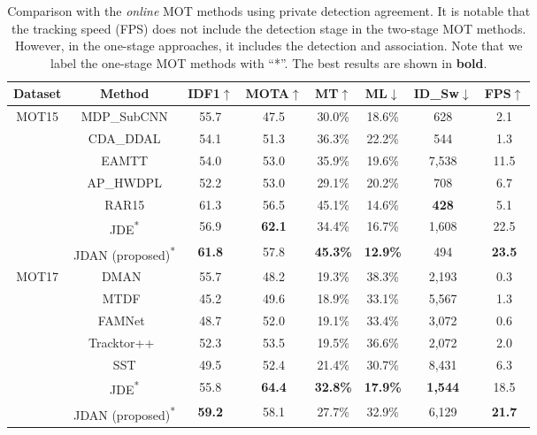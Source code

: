 \documentclass[acmsmall]{acmart}
\begin{document}
\begin{table}[tbp]
	\begin{center}
		\caption{
			Comparison with the \emph{online} MOT methods using private detection agreement. 
			It is notable that the tracking speed (FPS) does not include the detection stage in the two-stage MOT methods. 
			However, in the one-stage approaches, it includes the detection and association. 
			Note that we label the one-stage MOT methods with ``*''. 
			The best results are shown in {\bf bold}.
		}
		\label{table:sota}
		\centering
		\setlength{\tabcolsep}{3.5pt}
		\begin{tabular}{c|c|cccccc}
			\hline
			\hline
			Dataset & Method & IDF1$\uparrow$ & MOTA$\uparrow$ & MT$\uparrow$ & ML$\downarrow$ & ID\_Sw$\downarrow$ & FPS$\uparrow$\\
			\hline
			MOT15 
			& MDP\_SubCNN\cite{xiang2015learning} & 55.7 & 47.5 & 30.0\% & 18.6\% & 628 & 2.1\\
			& CDA\_DDAL\cite{bae2017confidence} & 54.1 & 51.3 & 36.3\% & 22.2\% & 544 & 1.3\\
			& EAMTT\cite{sanchez2016online} & 54.0 & 53.0 & 35.9\% & 19.6\% & 7,538 & 11.5\\ 
			& AP\_HWDPL\cite{chen2017online} & 52.2 & 53.0 & 29.1\% & 20.2\% & 708 & 6.7\\
			& RAR15\cite{fang2018recurrent} & 61.3 & 56.5 & 45.1\% & 14.6\% & {\bf 428} & 5.1\\
			& {JDE\cite{jde}\textsuperscript{*}} & {56.9} & {{\bf 62.1}} & {34.4\%} & {16.7\%} & {1,608} & {22.5}\\
			& JDAN (proposed)\textsuperscript{*} & {\bf 61.8} & 57.8 & {\bf 45.3\%} & {\bf 12.9\%} & 494 & {\bf 23.5}\\
			\hline
			MOT17 
			& DMAN~\cite{dual_matching} & 55.7 & 48.2 & 19.3\% & 38.3\% & 2,193 & 0.3\\
			& MTDF~\cite{gm_phd} & 45.2 & 49.6 & 18.9\% & 33.1\% & 5,567 & 1.3\\
			& FAMNet~\cite{famnet} & 48.7 & 52.0 & 19.1\% & 33.4\% & 3,072 & 0.6\\
			& Tracktor++~\cite{tracktor} & 52.3 & 53.5 & 19.5\% & 36.6\% & 2,072 & 2.0\\
			& SST\cite{dan} & 49.5 & 52.4 & 21.4\% & 30.7\% & 8,431 & 6.3\\
			& {JDE\cite{jde}\textsuperscript{*}} & {55.8} & {{\bf 64.4}} & {{\bf 32.8\%}} & {{\bf 17.9\%}} & {{\bf 1,544}} & {18.5}\\
			& JDAN (proposed)\textsuperscript{*} & {\bf 59.2} & 58.1 & 27.7\% & 32.9\% & {6,129} & {\bf 21.7}\\
			\hline
			\hline
		\end{tabular}
	\end{center}
\end{table}
\end{document}
